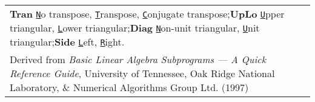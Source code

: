 \documentclass[10pt,a3paper, landscape]{article}
\newcommand{\key}[1]{\underline{\texttt{#1}}}
\begin{document}
\begin{tabular}{ll>{\ttfamily}l}
		\multicolumn{3}{l}{\small\textbf{Tran}\; \key{N}o transpose, \key{T}ranspose, \key{C}onjugate transpose;\quad \textbf{UpLo}\; \key{U}pper triangular, \key{L}ower triangular;\quad\textbf{Diag}\; \key{N}on-unit triangular, \key{U}nit triangular;\quad\textbf{Side}\; \key{L}eft, \key{R}ight.}                                                                                    \\
		\multicolumn{3}{l}{\scriptsize Derived from \emph{Basic Linear Algebra Subprograms --- A Quick Reference Guide}, University of Tennessee, Oak Ridge National Laboratory, \& Numerical Algorithms Group Ltd. (1997)}
	\end{tabular}
		

	
	
	
	
\end{document}
